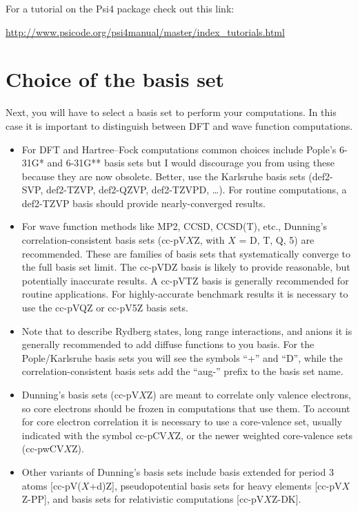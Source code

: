 \documentclass[../Main/chem532-notes.tex]{subfiles}
\begin{document}
\begin{ibox}
For a tutorial on the Psi4 package check out this link:

\url{http://www.psicode.org/psi4manual/master/index_tutorials.html}
\end{ibox}


\section{Choice of the basis set}
Next, you will have to select a basis set to perform your computations.
In this case it is important to distinguish between DFT and wave function computations.
\begin{itemize}
\item For DFT and Hartree--Fock computations common choices include Pople's 6-31G* and 6-31G** basis sets but I would discourage you from using these because they are now obsolete. Better, use the Karlsruhe basis sets (def2-SVP, def2-TZVP, def2-QZVP, def2-TZVPD, \ldots). For routine computations, a def2-TZVP basis should provide nearly-converged results.

\item For wave function methods like MP2, CCSD, CCSD(T), etc., Dunning's  correlation-consistent basis sets (cc-pV$X$Z, with $X$ = D, T, Q, 5) are recommended. These are families of basis sets that systematically converge to the full basis set limit.
The cc-pVDZ basis is likely to provide reasonable, but potentially inaccurate results. A cc-pVTZ basis is generally recommended for routine applications. 
For highly-accurate benchmark results it is necessary to use the cc-pVQZ or cc-pV5Z basis sets.

\item Note that to describe Rydberg states, long range interactions, and anions it is generally recommended to add diffuse functions to you basis. For the Pople/Karlsruhe basis sets you will see the symbols ``+'' and ``D'', while the correlation-consistent basis sets add the ``aug-'' prefix to the basis set name.

\item Dunning's basis sets (cc-pV$X$Z) are meant to correlate only valence electrons, so core electrons should be frozen in computations that use them.
To account for core electron correlation it is necessary to use a core-valence set, usually indicated with the symbol cc-pCV$X$Z, or the newer weighted core-valence sets (cc-pwCV$X$Z). 

\item Other variants of Dunning's basis sets include basis extended for period 3 atoms [cc-pV($X$+d)Z], pseudopotential basis sets for heavy elements [cc-pV$X$Z-PP], and basis sets for relativistic computations [cc-pV$X$Z-DK].

\end{itemize}
\end{document}
